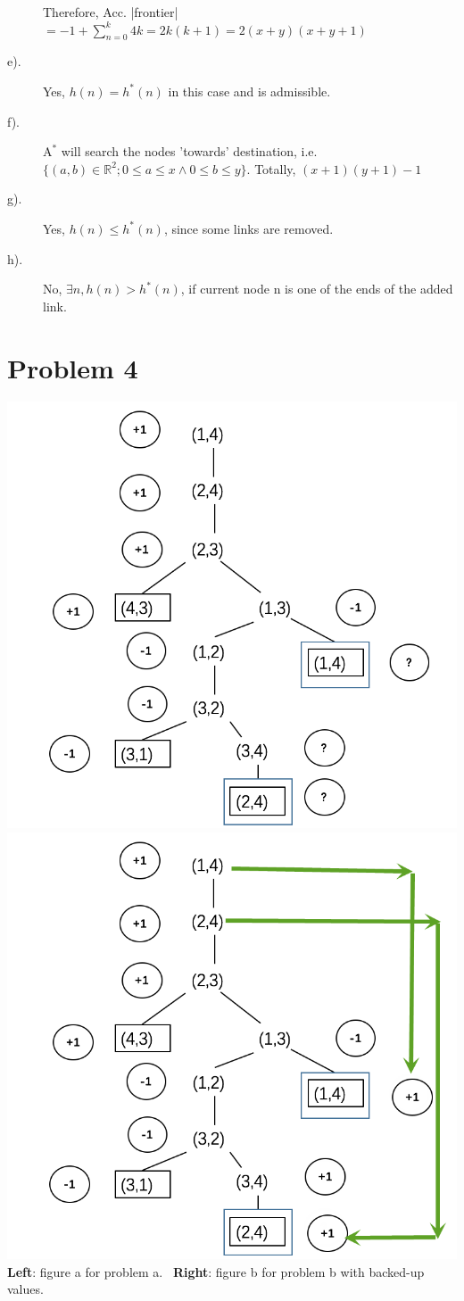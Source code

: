 \documentclass{mcmthesis}
\begin{document}
\begin{description}
	Therefore, Acc. |frontier|$=-1+\sum_{n=0}^{k} 4k=2k(k+1)=2(x+y)(x+y+1)$

	\item[e).] Yes, $h(n)=h^*(n)$ in this case and is admissible.
	\item[f).]  $\text{A}^*$ will search the nodes 'towards' destination, i.e. $\{(a,b)\in \mathbb{R}^2; 0\le a \le x \wedge 0 \le b \le y \}$. Totally, $(x+1)(y+1)-1$
	\item[g).] Yes, $h(n) \le h^*(n)$, since some links are removed.
	\item[h).] No,  $\exists n, h(n) > h^*(n)$, if current node n is  one of the ends of the added link.
	
\end{description}
\section{Problem 4}

\begin{center}
	\includegraphics[width=.45\columnwidth]{fig2} \qquad \includegraphics[width=.45\columnwidth]{fig3} \\
	\textbf{Left}: figure a for problem a. \  \textbf{Right}: figure b for problem b with backed-up values.
\end{center}
\end{document}
